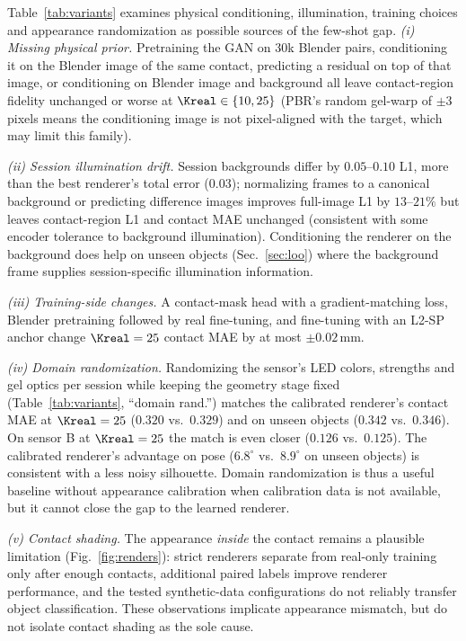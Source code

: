 Table~\ref{tab:variants} examines physical conditioning, illumination, training choices and appearance randomization as possible sources of the few-shot gap.
\emph{(i) Missing physical prior.} Pretraining the GAN on $30$k Blender pairs, conditioning it on the Blender image of the same contact, predicting a residual on top of that image, or conditioning on Blender image and background all leave contact-region fidelity unchanged or worse at $\Kreal\in\{10,25\}$ (PBR's random gel-warp of $\pm3$ pixels means the conditioning image is not pixel-aligned with the target, which may limit this family).

\emph{(ii) Session illumination drift.} Session backgrounds differ by $0.05$--$0.10$ L1, more than the best renderer's total error ($0.03$); normalizing frames to a canonical background or predicting difference images improves full-image L1 by $13$--$21\%$ but leaves contact-region L1 and contact MAE unchanged (consistent with some encoder tolerance to background illumination). Conditioning the renderer on the background does help on unseen objects (Sec.~\ref{sec:loo}) where the background frame supplies session-specific illumination information.

\emph{(iii) Training-side changes.} A contact-mask head with a gradient-matching loss, Blender pretraining followed by real fine-tuning, and fine-tuning with an L2-SP anchor change $\Kreal=25$ contact MAE by at most $\pm0.02\,$mm.

\emph{(iv) Domain randomization.} Randomizing the sensor's LED colors, strengths and gel optics per session while keeping the geometry stage fixed (Table~\ref{tab:variants}, ``domain rand.'') matches the calibrated renderer's contact MAE at $\Kreal=25$ ($0.320$ vs.\ $0.329$) and on unseen objects ($0.342$ vs.\ $0.346$). On sensor B at $\Kreal=25$ the match is even closer ($0.126$ vs.\ $0.125$). The calibrated renderer's advantage on pose ($6.8^\circ$ vs.\ $8.9^\circ$ on unseen objects) is consistent with a less noisy silhouette. Domain randomization is thus a useful baseline without appearance calibration when calibration data is not available, but it cannot close the gap to the learned renderer.

\emph{(v) Contact shading.} The appearance \emph{inside} the contact remains a plausible limitation (Fig.~\ref{fig:renders}): strict renderers separate from real-only training only after enough contacts, additional paired labels improve renderer performance, and the tested synthetic-data configurations do not reliably transfer object classification. These observations implicate appearance mismatch, but do not isolate contact shading as the sole cause.

